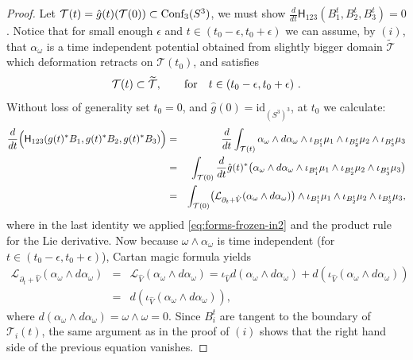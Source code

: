 \documentclass[12pt]{article}
\numberwithin{equation}{section}
\newcommand{\Cnf}{\text{\rm Conf}}
\newcommand{\no}{\noindent}
\begin{document}
\begin{proof}
\no Let $\mathcal{T}(t)=\hat{g}(t)(\mathcal{T}(0))\subset \Cnf_3(S^3)$, we must show $\frac{d}{dt} 
\mathsf{H}_{123}(B^t_1,B^t_2,B^t_3)=0$. Notice that 
for small enough $\epsilon$ and $t\in (t_0-\epsilon,t_0+\epsilon)$ we can assume, by $(i)$, that $\alpha_\omega$ is a time independent potential obtained from slightly bigger domain $\widetilde{\mathcal{T}}$ which deformation retracts on $\mathcal{T}(t_0)$, and satisfies 
\[
  \mathcal{T}(t)\subset\widetilde{\mathcal{T}},\qquad \text{\rm for}\quad t\in (t_0-\epsilon,t_0+\epsilon)\ .
\]
 Without loss of generality set 
$t_0=0$, and $\hat{g}(0)=\text{id}_{(S^3)^3}$, at $t_0$ we calculate:
\begin{eqnarray*}
 \frac{d}{dt} 
 \Bigl(\mathsf{H}_{123}(g(t)^\ast B_1,g(t)^\ast B_2,g(t)^\ast B_3)\Bigr) & = &
 \frac{d}{dt} \int_{\mathcal{T}(t)} \alpha_\omega\wedge d\alpha_\omega\wedge \iota_{B^t_1}\mu_1\wedge \iota_{B^t_2}\mu_2\wedge \iota_{B^t_3}\mu_3\\
 & = & \int_{\mathcal{T}(0)} \frac{d}{dt} \hat{g}(t)^\ast\bigl(\alpha_\omega\wedge d\alpha_\omega\wedge \iota_{B^t_1}\mu_1\wedge \iota_{B^t_2}\mu_2\wedge \iota_{B^t_3}\mu_3\bigr)\\
 & = & \int_{\mathcal{T}(0)} \bigl(\mathcal{L}_{\partial_t+\hat{V}}(\alpha_\omega\wedge d\alpha_\omega)\bigr)\wedge \iota_{B^t_1}\mu_1\wedge \iota_{B^t_2}\mu_2\wedge \iota_{B^t_3}\mu_3,
\end{eqnarray*}
where in the last identity we applied \eqref{eq:forms-frozen-in2} and the product rule for the Lie derivative.
Now because $\omega\wedge\alpha_\omega$ is time independent (for $t\in (t_0-\epsilon,t_0+\epsilon)$), Cartan magic formula yields
\begin{eqnarray*}
 \mathcal{L}_{\partial_t+\hat{V}}(\alpha_\omega\wedge d\alpha_\omega) & = & \mathcal{L}_{\hat{V}}(\alpha_\omega\wedge d\alpha_\omega) = \iota_{\hat{V}} d(\alpha_\omega\wedge d\alpha_\omega)+ d(\iota_{\hat{V}} (\alpha_\omega\wedge d\alpha_\omega))\\
 & =  & d(\iota_{\hat{V}} (\alpha_\omega\wedge d\alpha_\omega)),
\end{eqnarray*}
where $d(\alpha_\omega\wedge d\alpha_\omega)=\omega\wedge\omega=0$. 
 Since $B^t_i$ are tangent to the boundary of $\mathcal{T}_i(t)$, the same argument as in the proof of $(i)$ shows that the right hand side of the previous equation vanishes.
\end{proof}
\end{document}
